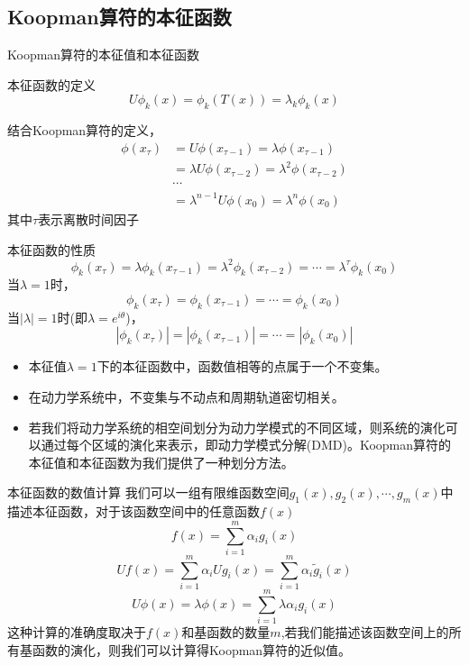 \documentclass{beamer}
\begin{document}
	\subsection{Koopman算符的本征函数}
		\begin{frame}{Koopman算符的本征值和本征函数}
			\begin{block}{本征函数的定义}
				$$U\phi _k(x)=\phi _k(T(x))=\lambda _k\phi _k(x)$$
			\end{block}
		结合Koopman算符的定义，
			\begin{align*}
			\phi(x_\tau)&=U\phi(x_{\tau-1})=\lambda\phi(x_{\tau-1})\\
			&=\lambda U\phi(x_{\tau-2})=\lambda^2\phi(x_{\tau-2})\\
			&\cdots\\
			&=\lambda^{n-1}U\phi(x_0)=\lambda^n\phi(x_0)
			\end{align*}
		其中$\tau$表示离散时间因子

		\end{frame}
		\begin{frame}{本征函数的性质}
		$$\boxed{\phi_k(x_\tau)=\lambda\phi_k(x_{\tau-1})=\lambda^2\phi_k(x_{\tau-2})=\cdots=\lambda^\tau\phi_k(x_0)}$$
			当$\lambda=1$时，$$\phi_k(x_\tau)=\phi_k(x_{\tau-1})=\cdots=\phi_k(x_0)$$
			当$|\lambda|=1$时(即$\lambda=e^{i\theta}$)，$$|\phi_k(x_\tau)|=|\phi_k(x_{\tau-1})|=\cdots=|\phi_k(x_0)|$$
			\begin{itemize}
				\item 本征值$\lambda=1$下的本征函数中，函数值相等的点属于一个不变集。
				\item 在动力学系统中，不变集与不动点和周期轨道密切相关。
				\item 若我们将动力学系统的相空间划分为动力学模式的不同区域，则系统的演化可以通过每个区域的演化来表示，即动力学模式分解(DMD)。Koopman算符的本征值和本征函数为我们提供了一种划分方法。
			\end{itemize}
		\end{frame}
	    \begin{frame}{本征函数的数值计算}
	    	我们可以一组有限维函数空间$g_1(x),g_2(x),\cdots,g_m(x)$中描述本征函数，对于该函数空间中的任意函数$f(x)$
	    	$$f(x)=\sum_{i=1}^m\alpha_ig_i(x)$$
	    	$$Uf(x)=\sum_{i=1}^{m}\alpha_iUg_i(x)=\sum_{i=1}^{m}\alpha_i\tilde{g}_i(x)$$
	    	$$U\phi(x)=\lambda\phi(x)=\sum_{i=1}^{m}\lambda \alpha_ig_i(x)$$
	    	这种计算的准确度取决于$f(x)$和基函数的数量$m$,若我们能描述该函数空间上的所有基函数的演化，则我们可以计算得Koopman算符的近似值。
	    \end{frame}
\end{document}
